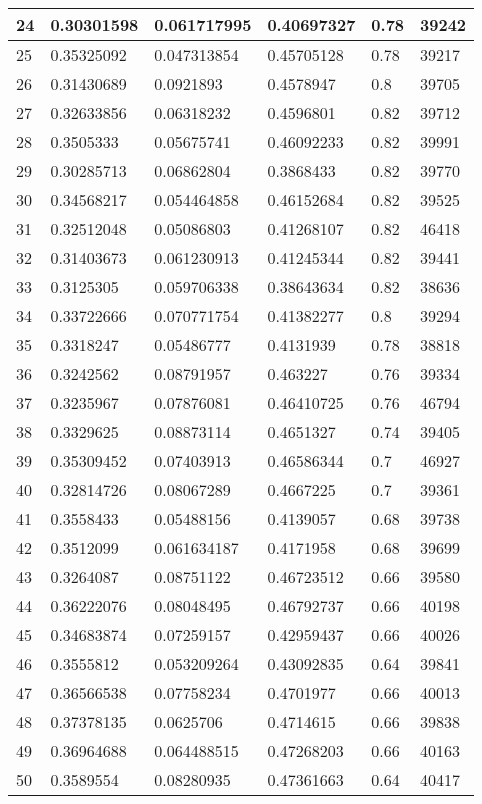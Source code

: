 \begin{longtable}{|l|l|l|l|l|l|}
24 & 0.30301598 & 0.061717995 & 0.40697327 & 0.78 & 39242 \\ \hline 
25 & 0.35325092 & 0.047313854 & 0.45705128 & 0.78 & 39217 \\ \hline 
26 & 0.31430689 & 0.0921893 & 0.4578947 & 0.8 & 39705 \\ \hline 
27 & 0.32633856 & 0.06318232 & 0.4596801 & 0.82 & 39712 \\ \hline 
28 & 0.3505333 & 0.05675741 & 0.46092233 & 0.82 & 39991 \\ \hline 
29 & 0.30285713 & 0.06862804 & 0.3868433 & 0.82 & 39770 \\ \hline 
30 & 0.34568217 & 0.054464858 & 0.46152684 & 0.82 & 39525 \\ \hline 
31 & 0.32512048 & 0.05086803 & 0.41268107 & 0.82 & 46418 \\ \hline 
32 & 0.31403673 & 0.061230913 & 0.41245344 & 0.82 & 39441 \\ \hline 
33 & 0.3125305 & 0.059706338 & 0.38643634 & 0.82 & 38636 \\ \hline 
34 & 0.33722666 & 0.070771754 & 0.41382277 & 0.8 & 39294 \\ \hline 
35 & 0.3318247 & 0.05486777 & 0.4131939 & 0.78 & 38818 \\ \hline 
36 & 0.3242562 & 0.08791957 & 0.463227 & 0.76 & 39334 \\ \hline 
37 & 0.3235967 & 0.07876081 & 0.46410725 & 0.76 & 46794 \\ \hline 
38 & 0.3329625 & 0.08873114 & 0.4651327 & 0.74 & 39405 \\ \hline 
39 & 0.35309452 & 0.07403913 & 0.46586344 & 0.7 & 46927 \\ \hline 
40 & 0.32814726 & 0.08067289 & 0.4667225 & 0.7 & 39361 \\ \hline 
41 & 0.3558433 & 0.05488156 & 0.4139057 & 0.68 & 39738 \\ \hline 
42 & 0.3512099 & 0.061634187 & 0.4171958 & 0.68 & 39699 \\ \hline 
43 & 0.3264087 & 0.08751122 & 0.46723512 & 0.66 & 39580 \\ \hline 
44 & 0.36222076 & 0.08048495 & 0.46792737 & 0.66 & 40198 \\ \hline 
45 & 0.34683874 & 0.07259157 & 0.42959437 & 0.66 & 40026 \\ \hline 
46 & 0.3555812 & 0.053209264 & 0.43092835 & 0.64 & 39841 \\ \hline 
47 & 0.36566538 & 0.07758234 & 0.4701977 & 0.66 & 40013 \\ \hline 
48 & 0.37378135 & 0.0625706 & 0.4714615 & 0.66 & 39838 \\ \hline 
49 & 0.36964688 & 0.064488515 & 0.47268203 & 0.66 & 40163 \\ \hline 
50 & 0.3589554 & 0.08280935 & 0.47361663 & 0.64 & 40417 \\ \hline 
\end{longtable}